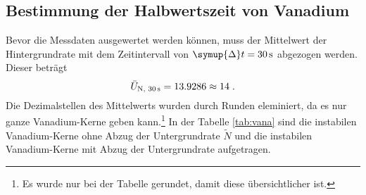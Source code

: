 \subsection{Bestimmung der Halbwertszeit von Vanadium}
\label{sub:Vana}
Bevor die Messdaten ausgewertet werden können, muss der Mittelwert der Hintergrundrate mit dem Zeitintervall von $\symup{\Delta} t = \SI{30}{\second}$
abgezogen werden. Dieser beträgt
\begin{equation*}
    \bar{U}_\text{N, \SI{30}{\second}} = 13.9286 \approx 14 \; \text{.}
\end{equation*}
Die Dezimalstellen des Mittelwerts wurden durch Runden eleminiert, da es nur ganze Vanadium-Kerne geben kann.\footnote{Es wurde nur bei der Tabelle gerundet, damit diese
übersichtlicher ist.}
In der Tabelle \ref{tab:vana} sind die instabilen Vanadium-Kerne ohne Abzug der Untergrundrate $\tilde{N}$ und die instabilen Vanadium-Kerne mit Abzug 
der Untergrundrate aufgetragen.
